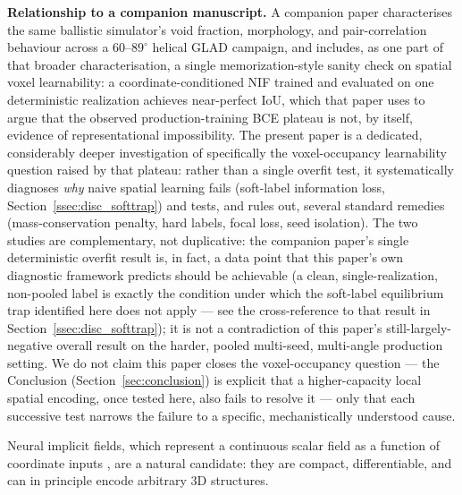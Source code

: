 \documentclass[aip,amsmath,amssymb,reprint]{revtex4-1}
\begin{document}
\textbf{Relationship to a companion manuscript.} A companion paper
\citep{companionP1} characterises the same ballistic simulator's void fraction,
morphology, and pair-correlation behaviour across a $60$--$89^{\circ}$
helical GLAD campaign, and includes, as one part of that broader
characterisation, a single memorization-style sanity check on
spatial voxel learnability: a coordinate-conditioned NIF trained
and evaluated on one deterministic realization achieves
near-perfect IoU, which that paper uses to argue that the observed
production-training BCE plateau is not, by itself, evidence of
representational impossibility.
The present paper is a dedicated, considerably deeper investigation
of specifically the voxel-occupancy learnability question raised by
that plateau: rather than a single overfit test, it systematically
diagnoses \emph{why} naive spatial learning fails (soft-label
information loss, Section~\ref{ssec:disc_softtrap}) and tests, and
rules out, several standard remedies (mass-conservation penalty,
hard labels, focal loss, seed isolation).
The two studies are complementary, not duplicative: the companion
paper's single deterministic overfit result is, in fact, a data
point that this paper's own diagnostic framework predicts should be
achievable (a clean, single-realization, non-pooled label is exactly
the condition under which the soft-label equilibrium trap identified
here does not apply — see the cross-reference to that result in
Section~\ref{ssec:disc_softtrap}); it is not a contradiction of this
paper's still-largely-negative overall result on the harder,
pooled multi-seed, multi-angle production setting.
We do not claim this paper closes the voxel-occupancy question — the
Conclusion (Section~\ref{sec:conclusion}) is explicit that a higher-capacity
local spatial encoding, once tested here, also fails to resolve it — only
that each successive test narrows the failure
to a specific, mechanistically understood cause.

Neural implicit fields, which represent a continuous scalar field as
a function of coordinate inputs \citep{mildenhall2020nerf}, are a
natural candidate: they are compact, differentiable, and can in
principle encode arbitrary 3D structures.
\end{document}

